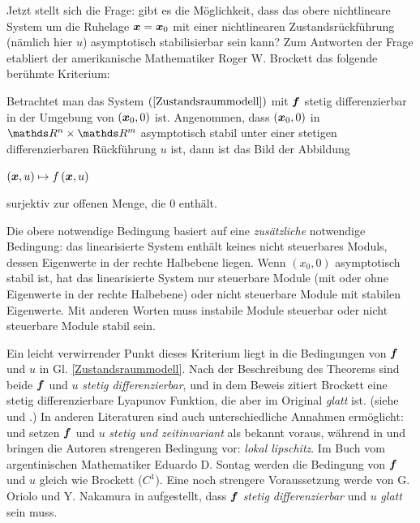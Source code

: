 Jetzt stellt sich die Frage: gibt es die Möglichkeit, dass das obere nichtlineare System um die Ruhelage $\boldsymbol x=\boldsymbol x_{0}$ mit einer nichtlinearen Zustandsrückführung (nämlich hier $u$) asymptotisch stabilisierbar sein kann? Zum Antworten der Frage etabliert der amerikanische Mathematiker Roger W. Brockett das folgende berühmte Kriterium\cite{brockett1983asymptotic}:
\begin{theorem}
	Betrachtet man das System $(\ref{Zustandsraummodell})$ mit $\boldsymbol f$ stetig differenzierbar in der Umgebung von $(\boldsymbol x_{0},0)$ ist. Angenommen, dass $(\boldsymbol x_{0},0)$ in $\Reals^{n}\times\Reals^{m}$ asymptotisch stabil unter einer stetigen differenzierbaren Rückführung $u$ ist, dann ist das Bild der Abbildung
	\begin{center}$\left ( \boldsymbol x,u \right ) \mapsto f\left ( \boldsymbol x,u \right )$\end{center}
	surjektiv zur offenen Menge, die 0 enthält.
\end{theorem}
Die obere notwendige Bedingung basiert auf eine \emph{zusätzliche} notwendige Bedingung: das linearisierte System enthält keines nicht steuerbares Moduls, dessen Eigenwerte in  der rechte Halbebene liegen. Wenn $(x_{0},0)$ asymptotisch stabil ist, hat das linearisierte System nur steuerbare Module (mit oder ohne Eigenwerte in der rechte Halbebene) oder nicht steuerbare Module mit stabilen Eigenwerte. Mit anderen Worten muss instabile Module steuerbar oder nicht steuerbare Module stabil sein.

Ein leicht verwirrender Punkt dieses Kriterium liegt in die Bedingungen von $\boldsymbol f$ und $u$ in Gl. \ref{Zustandsraummodell}. Nach der Beschreibung des Theorems sind beide $\boldsymbol f$ und $u$ \emph{stetig differenzierbar}, und in dem Beweis zitiert Brockett eine stetig differenzierbare Lyapunov Funktion, die aber im Original \emph{glatt} ist. (siehe \cite[S.186]{brockett1983asymptotic} und \cite[S.324]{wilson1967structure}.) In anderen Literaturen sind auch unterschiedliche Annahmen ermöglicht: \cite{coron2007control} und \cite{orsi2003necessary} setzen $\boldsymbol f$ und $u$ \emph{stetig und zeitinvariant} als bekannt voraus, während in \cite{stern2002brockett} und \cite{colonius2012nichtlineare} bringen die Autoren strengeren Bedingung vor: \emph{lokal lipschitz}. Im Buch vom argentinischen Mathematiker Eduardo D. Sontag \cite{sontag2013mathematical} werden die Bedingung von $\boldsymbol f$ und $u$ gleich wie Brockett ($C^{1}$). Eine noch strengere Voraussetzung werde von G. Oriolo und Y. Nakamura in \cite{oriolo1991control} aufgestellt, dass $\boldsymbol f$ \emph{stetig differenzierbar} und $u$ \emph{glatt} sein muss.

